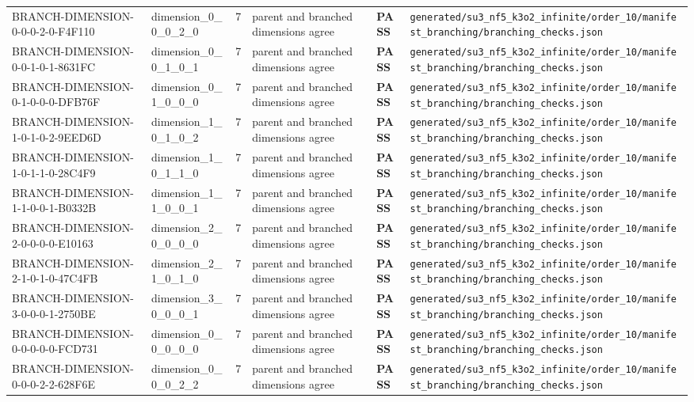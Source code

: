 \documentclass[11pt]{article}
\newcommand{\Pass}{\textcolor{green!50!black}{\textbf{PASS}}}
\newcommand{\RawPath}[1]{\texttt{#1}}
\begin{document}
\begin{longtable}{p{3cm}p{2.5cm}r p{3cm}l p{2cm}}
BRANCH-DIMENSION-0-0-0-2-0-F4F110 & dimension\_0\_0\_0\_2\_0 & 7 & parent and branched dimensions agree & \Pass & \RawPath{generated/su3\_nf5\_k3o2\_infinite/order\_10/manifest\_branching/branching\_checks.json}\\
BRANCH-DIMENSION-0-0-1-0-1-8631FC & dimension\_0\_0\_1\_0\_1 & 7 & parent and branched dimensions agree & \Pass & \RawPath{generated/su3\_nf5\_k3o2\_infinite/order\_10/manifest\_branching/branching\_checks.json}\\
BRANCH-DIMENSION-0-1-0-0-0-DFB76F & dimension\_0\_1\_0\_0\_0 & 7 & parent and branched dimensions agree & \Pass & \RawPath{generated/su3\_nf5\_k3o2\_infinite/order\_10/manifest\_branching/branching\_checks.json}\\
BRANCH-DIMENSION-1-0-1-0-2-9EED6D & dimension\_1\_0\_1\_0\_2 & 7 & parent and branched dimensions agree & \Pass & \RawPath{generated/su3\_nf5\_k3o2\_infinite/order\_10/manifest\_branching/branching\_checks.json}\\
BRANCH-DIMENSION-1-0-1-1-0-28C4F9 & dimension\_1\_0\_1\_1\_0 & 7 & parent and branched dimensions agree & \Pass & \RawPath{generated/su3\_nf5\_k3o2\_infinite/order\_10/manifest\_branching/branching\_checks.json}\\
BRANCH-DIMENSION-1-1-0-0-1-B0332B & dimension\_1\_1\_0\_0\_1 & 7 & parent and branched dimensions agree & \Pass & \RawPath{generated/su3\_nf5\_k3o2\_infinite/order\_10/manifest\_branching/branching\_checks.json}\\
BRANCH-DIMENSION-2-0-0-0-0-E10163 & dimension\_2\_0\_0\_0\_0 & 7 & parent and branched dimensions agree & \Pass & \RawPath{generated/su3\_nf5\_k3o2\_infinite/order\_10/manifest\_branching/branching\_checks.json}\\
BRANCH-DIMENSION-2-1-0-1-0-47C4FB & dimension\_2\_1\_0\_1\_0 & 7 & parent and branched dimensions agree & \Pass & \RawPath{generated/su3\_nf5\_k3o2\_infinite/order\_10/manifest\_branching/branching\_checks.json}\\
BRANCH-DIMENSION-3-0-0-0-1-2750BE & dimension\_3\_0\_0\_0\_1 & 7 & parent and branched dimensions agree & \Pass & \RawPath{generated/su3\_nf5\_k3o2\_infinite/order\_10/manifest\_branching/branching\_checks.json}\\
BRANCH-DIMENSION-0-0-0-0-0-FCD731 & dimension\_0\_0\_0\_0\_0 & 7 & parent and branched dimensions agree & \Pass & \RawPath{generated/su3\_nf5\_k3o2\_infinite/order\_10/manifest\_branching/branching\_checks.json}\\
BRANCH-DIMENSION-0-0-0-2-2-628F6E & dimension\_0\_0\_0\_2\_2 & 7 & parent and branched dimensions agree & \Pass & \RawPath{generated/su3\_nf5\_k3o2\_infinite/order\_10/manifest\_branching/branching\_checks.json}\\

\end{longtable}
\end{document}
